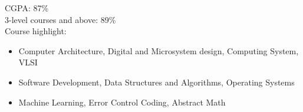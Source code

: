 \documentclass[10pt,a4paper,ragged2e,withhyper]{altacv}
\begin{document}
\begin{paracol}{2}










CGPA: 87\% \\
3-level courses and above: 89\% \\
Course highlight: \begin{itemize}
    \item Computer Architecture, Digital and Microsystem design, Computing System, VLSI
    \item Software Development, Data Structures and Algorithms, Operating Systems
    \item Machine Learning, Error Control Coding, Abstract Math
\end{itemize}






\end{paracol}
\end{document}
